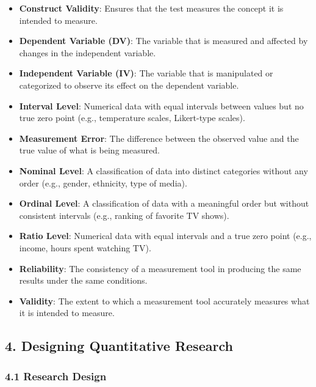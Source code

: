 \documentclass[
]{book}
\providecommand{\tightlist}{%
  \setlength{\itemsep}{0pt}\setlength{\parskip}{0pt}}
\begin{document}
\begin{itemize}
\tightlist
\item
  \textbf{Construct Validity}: Ensures that the test measures the concept it is intended to measure.
\item
  \textbf{Dependent Variable (DV)}: The variable that is measured and affected by changes in the independent variable.
\item
  \textbf{Independent Variable (IV)}: The variable that is manipulated or categorized to observe its effect on the dependent variable.
\item
  \textbf{Interval Level}: Numerical data with equal intervals between values but no true zero point (e.g., temperature scales, Likert-type scales).
\item
  \textbf{Measurement Error}: The difference between the observed value and the true value of what is being measured.
\item
  \textbf{Nominal Level}: A classification of data into distinct categories without any order (e.g., gender, ethnicity, type of media).
\item
  \textbf{Ordinal Level}: A classification of data with a meaningful order but without consistent intervals (e.g., ranking of favorite TV shows).
\item
  \textbf{Ratio Level}: Numerical data with equal intervals and a true zero point (e.g., income, hours spent watching TV).
\item
  \textbf{Reliability}: The consistency of a measurement tool in producing the same results under the same conditions.
\item
  \textbf{Validity}: The extent to which a measurement tool accurately measures what it is intended to measure.
\end{itemize}

\subsection*{\texorpdfstring{4. \textbf{Designing Quantitative Research}}{4. Designing Quantitative Research}}\label{designing-quantitative-research-1}

\subsubsection*{\texorpdfstring{\textbf{4.1 Research Design}}{4.1 Research Design}}\label{research-design-1}
\end{document}
